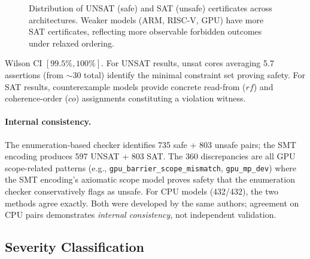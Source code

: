 \documentclass[11pt]{article}
\begin{document}
\begin{figure}[ht]
\centering
{}
\caption{Distribution of UNSAT (safe) and SAT (unsafe) certificates across
architectures. Weaker models (ARM, RISC-V, GPU) have more SAT certificates,
reflecting more observable forbidden outcomes under relaxed ordering.}
\label{fig:cert-distribution}
\end{figure}

\noindent
Wilson CI $[99.5\%, 100\%]$. For UNSAT results, unsat cores
averaging 5.7 assertions (from $\sim$30 total) identify the
minimal constraint set proving safety.  For SAT results,
counterexample models provide concrete read-from ($\mathit{rf}$) and
coherence-order ($\mathit{co}$) assignments constituting a
violation witness.

\paragraph{Internal consistency.} The enumeration-based checker
identifies 735 safe + 803 unsafe pairs; the SMT encoding produces
597 UNSAT + 803 SAT. The 360 discrepancies are all GPU
scope-related patterns (e.g., \texttt{gpu\_barrier\_scope\_mismatch},
\texttt{gpu\_mp\_dev}) where the SMT encoding's axiomatic scope model
proves safety that the enumeration checker conservatively flags as unsafe.
For CPU models (432/432), the two methods agree exactly.
Both were developed by the same authors; agreement on CPU pairs
demonstrates \emph{internal consistency}, not independent validation.

\subsection{Severity Classification}
\label{sec:severity}
\end{document}

